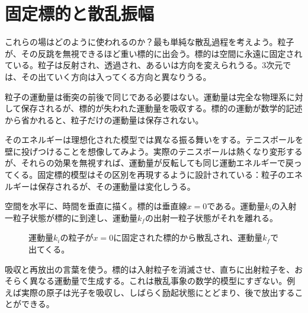 
\section{固定標的と散乱振幅}

これらの場はどのように使われるのか？最も単純な散乱過程を考えよう。粒子が、その反跳を無視できるほど重い標的に出会う。標的は空間に永遠に固定されている。粒子は反射され、透過され、あるいは方向を変えられうる。3次元では、その出ていく方向は入ってくる方向と異なりうる。

粒子の運動量は衝突の前後で同じである必要はない。運動量は完全な物理系に対して保存されるが、標的が失われた運動量を吸収する。標的の運動が数学的記述から省かれると、粒子だけの運動量は保存されない。

そのエネルギーは理想化された模型では異なる振る舞いをする。テニスボールを壁に投げつけることを想像してみよう。実際のテニスボールは熱くなり変形するが、それらの効果を無視すれば、運動量が反転しても同じ運動エネルギーで戻ってくる。固定標的模型はその区別を再現するように設計されている：粒子のエネルギーは保存されるが、その運動量は変化しうる。

空間を水平に、時間を垂直に描く。標的は垂直線\(x=0\)である。運動量\(k_i\)の入射一粒子状態が標的に到達し、運動量\(k_f\)の出射一粒子状態がそれを離れる。

\begin{figure}[h]
\centering
{}
\caption{運動量\(k_i\)の粒子が\(x=0\)に固定された標的から散乱され、運動量\(k_f\)で出てくる。}
\end{figure}

吸収と再放出の言葉を使う。標的は入射粒子を消滅させ、直ちに出射粒子を、おそらく異なる運動量で生成する。これは散乱事象の数学的模型にすぎない。例えば実際の原子は光子を吸収し、しばらく励起状態にとどまり、後で放出することができる。

\begin{classroomqa}
\end{classroomqa}

